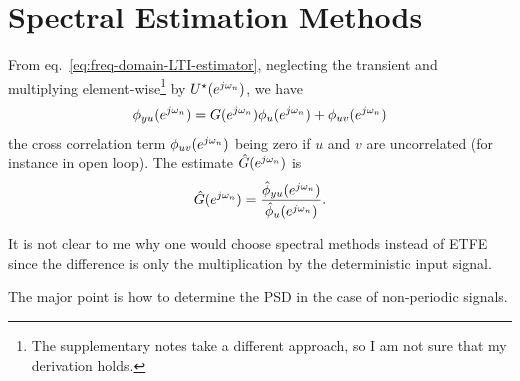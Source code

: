 \section{Spectral Estimation Methods}
\label{sec:spectral-estimation-methods}

From eq.~\eqref{eq:freq-domain-LTI-estimator}, neglecting the transient and multiplying element-wise\footnote{The supplementary notes take a different approach, so I am not sure that my derivation holds.} by $U^\star(e^{j\omega_n})$, we have
\begin{equation*}
  \phi_{yu}(e^{j\omega_n}) = G(e^{j\omega_n}) \phi_u(e^{j\omega_n}) + \phi_{uv}(e^{j\omega_n})
\end{equation*}
the cross correlation term $\phi_{uv}(e^{j\omega_n})$ being zero if $u$ and $v$ are uncorrelated (for instance in open loop). The estimate $\hat{G}(e^{j\omega_n})$ is
\begin{equation*}
  \hat{G}(e^{j\omega_n}) = \frac{\hat{\phi}_{yu}(e^{j\omega_n})}{\hat{\phi}_u(e^{j\omega_n})}.
\end{equation*}

It is not clear to me why one would choose spectral methods instead of ETFE since the difference is only the multiplication by the deterministic input signal.

The major point is how to determine the PSD in the case of non-periodic signals.

